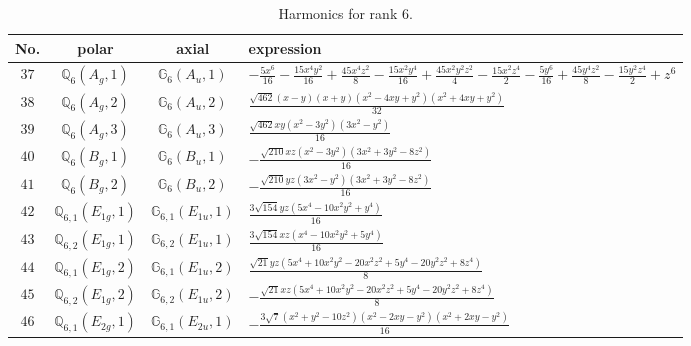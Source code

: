 \documentclass[fleqn,8pt,landscape]{jsarticle}
\begin{document}
\begin{table}[ht!]
\begin{center}
\caption{Harmonics for rank 6.}
\renewcommand{\arraystretch}{1.3}
\begin{tabular}{cccl} \hline \hline
No. & polar & axial & expression \\ \hline
$ 37 $ & $ \mathbb{Q}_{6}(A_{g},1) $ & $ \mathbb{G}_{6}(A_{u},1) $ & $ - \frac{5 x^{6}}{16} - \frac{15 x^{4} y^{2}}{16} + \frac{45 x^{4} z^{2}}{8} - \frac{15 x^{2} y^{4}}{16} + \frac{45 x^{2} y^{2} z^{2}}{4} - \frac{15 x^{2} z^{4}}{2} - \frac{5 y^{6}}{16} + \frac{45 y^{4} z^{2}}{8} - \frac{15 y^{2} z^{4}}{2} + z^{6} $ \\
$ 38 $ & $ \mathbb{Q}_{6}(A_{g},2) $ & $ \mathbb{G}_{6}(A_{u},2) $ & $ \frac{\sqrt{462} \left(x - y\right) \left(x + y\right) \left(x^{2} - 4 x y + y^{2}\right) \left(x^{2} + 4 x y + y^{2}\right)}{32} $ \\
$ 39 $ & $ \mathbb{Q}_{6}(A_{g},3) $ & $ \mathbb{G}_{6}(A_{u},3) $ & $ \frac{\sqrt{462} x y \left(x^{2} - 3 y^{2}\right) \left(3 x^{2} - y^{2}\right)}{16} $ \\
$ 40 $ & $ \mathbb{Q}_{6}(B_{g},1) $ & $ \mathbb{G}_{6}(B_{u},1) $ & $ - \frac{\sqrt{210} x z \left(x^{2} - 3 y^{2}\right) \left(3 x^{2} + 3 y^{2} - 8 z^{2}\right)}{16} $ \\
$ 41 $ & $ \mathbb{Q}_{6}(B_{g},2) $ & $ \mathbb{G}_{6}(B_{u},2) $ & $ - \frac{\sqrt{210} y z \left(3 x^{2} - y^{2}\right) \left(3 x^{2} + 3 y^{2} - 8 z^{2}\right)}{16} $ \\
$ 42 $ & $ \mathbb{Q}_{6,1}(E_{1g},1) $ & $ \mathbb{G}_{6,1}(E_{1u},1) $ & $ \frac{3 \sqrt{154} y z \left(5 x^{4} - 10 x^{2} y^{2} + y^{4}\right)}{16} $ \\
$ 43 $ & $ \mathbb{Q}_{6,2}(E_{1g},1) $ & $ \mathbb{G}_{6,2}(E_{1u},1) $ & $ \frac{3 \sqrt{154} x z \left(x^{4} - 10 x^{2} y^{2} + 5 y^{4}\right)}{16} $ \\
$ 44 $ & $ \mathbb{Q}_{6,1}(E_{1g},2) $ & $ \mathbb{G}_{6,1}(E_{1u},2) $ & $ \frac{\sqrt{21} y z \left(5 x^{4} + 10 x^{2} y^{2} - 20 x^{2} z^{2} + 5 y^{4} - 20 y^{2} z^{2} + 8 z^{4}\right)}{8} $ \\
$ 45 $ & $ \mathbb{Q}_{6,2}(E_{1g},2) $ & $ \mathbb{G}_{6,2}(E_{1u},2) $ & $ - \frac{\sqrt{21} x z \left(5 x^{4} + 10 x^{2} y^{2} - 20 x^{2} z^{2} + 5 y^{4} - 20 y^{2} z^{2} + 8 z^{4}\right)}{8} $ \\
$ 46 $ & $ \mathbb{Q}_{6,1}(E_{2g},1) $ & $ \mathbb{G}_{6,1}(E_{2u},1) $ & $ - \frac{3 \sqrt{7} \left(x^{2} + y^{2} - 10 z^{2}\right) \left(x^{2} - 2 x y - y^{2}\right) \left(x^{2} + 2 x y - y^{2}\right)}{16} $ \\

\end{tabular}
\end{center}
\end{table}
\end{document}

